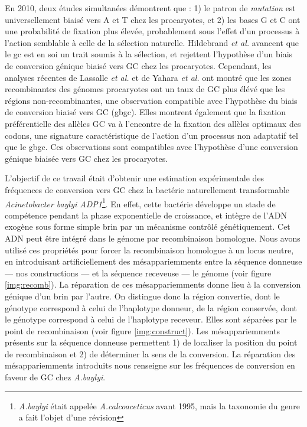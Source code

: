 En 2010, deux études simultanées\cite{hildebrand_evidence_2010,
  hershberg_evidence_2010} démontrent que : 1) le patron de \emph{mutation} est
universellement biaisé vers A et T chez les procaryotes, et 2) les bases G et C
ont une probabilité de fixation plus élevée, probablement sous l'effet d'un
processus à l'action semblable à celle de la sélection naturelle. Hildebrand
\emph{et al.} avancent que le \ac{gc} est en soi un trait soumis à la sélection,
et rejettent l'hypothèse d'un biais de conversion génique biaisé vers GC chez
les procaryotes. Cependant, les analyses récentes de Lassalle \emph{et al.}
\cite{lassalle_gc-content_2015} et de Yahara \emph{et
  al.}\cite{yahara_landscape_2016} ont montré que les zones recombinantes des
génomes procaryotes ont un taux de GC plus élévé que les régions
non-recombinantes, une observation compatible avec l'hypothèse du biais de
conversion biaisé vers GC (\ac{gbgc}). Elles montrent également que la fixation
préférentielle des allèles GC va à l'encontre de la fixation des allèles
optimaux des codons, une signature caractéristique de l'action d'un processus
non adaptatif tel que le \ac{gbgc}. Ces observations sont compatibles avec
l'hypothèse d'une conversion génique biaisée vers GC chez les procaryotes.

L'objectif de ce travail était d'obtenir une estimation expérimentale des
fréquences de conversion vers GC chez la bactérie naturellement transformable
\emph{Acinetobacter baylyi ADP1}\footnote{\emph{A.baylyi} était appelée
  \emph{A.calcoaceticus} avant 1995, mais la taxonomie du genre a fait l'objet
  d'une révision\cite{euzeby_list_1997}}. En effet, cette bactérie développe un
stade de compétence pendant la phase exponentielle de croissance, et intègre de
l'ADN exogène sous forme simple brin\cite{chen_dna_2004} par un mécanisme
contrôlé génétiquement. Cet ADN peut être intégré dans le génome par
recombinaison homologue. Nous avons utilisé ces propriétés pour forcer la
recombinaison homologue à un locus neutre, en introduisant artificiellement des
mésappariemments entre la séquence donneuse --- nos constructions --- et la
séquence receveuse --- le génome (voir figure \ref{img:recomb}). La réparation
de ces mésappariemments donne lieu à la conversion génique d'un brin par
l'autre. On distingue donc la région convertie, dont le génotype correspond à
celui de l'haplotype donneur, de la région conservée, dont le génotype
correspond à celui de l'haplotype receveur. Elles sont séparées par le point de
recombinaison (voir figure \ref{img:construct}). Les mésappariemments présents
sur la séquence donneuse permettent 1) de localiser la position du point de
recombinaison et 2) de déterminer la sens de la conversion. La réparation des
mésappariemments introduits nous renseigne sur les fréquences de conversion en
faveur de GC chez \emph{A.baylyi}.


\newpage
